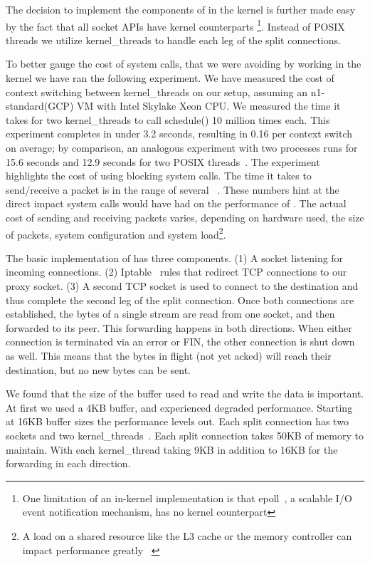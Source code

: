 The decision to implement the components of \oursys in the kernel is further made easy by the fact that all socket APIs have kernel counterparts \footnote{One limitation of an in-kernel implementation is that epoll~\cite{epoll}, a scalable I/O event notification mechanism, has no kernel counterpart}. Instead of POSIX threads we utilize kernel\_threads to handle each leg of the split connections. 


To better gauge the cost of system calls, that we were avoiding by working in the kernel we have ran the following experiment. We have measured the cost of context switching between kernel\_threads on our setup, assuming an n1-standard(GCP) VM with Intel Skylake Xeon CPU. We measured the time it takes for two kernel\_threads to call schedule() 10 million times each. This experiment completes in under 3.2 seconds, resulting in 0.16 \usec per context switch on average; by comparison, an analogous experiment with two processes runs for 15.6 seconds and 12.9 seconds for two POSIX threads~\cite{pthreads}. The experiment highlights the cost of using blocking system calls. The time it takes to send/receive a packet is in the range of several \usec ~\cite{Copy}. These numbers hint at the direct impact system calls would have had on the performance of \oursys. The actual cost of sending and receiving packets varies, depending on hardware used, the size of packets, system configuration and system load\footnote{A load on a shared resource like the L3 cache or the memory controller can impact performance greatly ~\cite{Damn}}. 


 The basic implementation of \oursys has three components. (1) A socket listening for incoming connections. (2) Iptable~\cite{iptables} rules that redirect TCP connections to our proxy socket. (3) A second TCP socket is used to connect to the destination and thus complete the second leg of the split connection. Once both connections are established, the bytes of a single stream are read from one socket, and then forwarded to its peer. This forwarding happens in both directions. When either connection is terminated via an error or FIN, the other connection is shut down as well. This means that the bytes in flight (\ie not yet acked) will reach their destination, but no new bytes can be sent.

 We found that the size of the buffer used to read and write the data is important. At first we used  a 4KB buffer, and experienced degraded performance. Starting at 16KB buffer sizes the performance levels out. Each split connection has two sockets and two kernel\_threads~\cite{kthread}. Each split connection takes 50KB of memory to maintain. With  each kernel\_thread taking 9KB in addition to 16KB for the forwarding in each direction.

